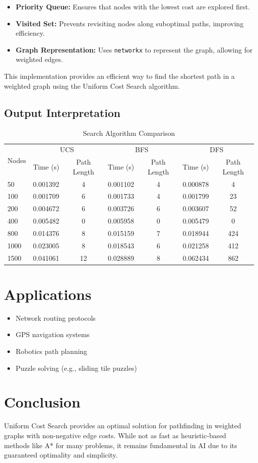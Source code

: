 \documentclass[final, journal, 11pt]{article}
\begin{document}
	\begin{itemize}
		\item \textbf{Priority Queue:} Ensures that nodes with the lowest cost are explored first.
		\item \textbf{Visited Set:} Prevents revisiting nodes along suboptimal paths, improving efficiency.
		\item \textbf{Graph Representation:} Uses \texttt{networkx} to represent the graph, allowing for weighted edges.
	\end{itemize}
	
	This implementation provides an efficient way to find the shortest path in a weighted graph using the Uniform Cost Search algorithm.
	
	\subsection{Output Interpretation}
	
	\begin{table}[htbp]
		\centering
		\caption{Search Algorithm Comparison}
		\begin{tabular}{lcccccc}
			\toprule
			\multirow{2}{*}{Nodes} & \multicolumn{2}{c}{UCS} & \multicolumn{2}{c}{BFS} & \multicolumn{2}{c}{DFS} \\
			\cmidrule(lr){2-3} \cmidrule(lr){4-5} \cmidrule(lr){6-7}
			& Time (s) & Path Length & Time (s) & Path Length & Time (s) & Path Length \\
			\midrule
			50   & 0.001392 & 4           & 0.001102 & 4           & 0.000878 & 4           \\
			100  & 0.001709 & 6           & 0.001733 & 4           & 0.001799 & 23          \\
			200  & 0.004672 & 6           & 0.003726 & 6           & 0.003607 & 52          \\
			400  & 0.005482 & 0           & 0.005958 & 0           & 0.005479 & 0           \\
			800  & 0.014376 & 8           & 0.015159 & 7           & 0.018944 & 424         \\
			1000 & 0.023005 & 8           & 0.018543 & 6           & 0.021258 & 412         \\
			1500 & 0.041061 & 12          & 0.028889 & 8           & 0.062434 & 862         \\
			\bottomrule
		\end{tabular}
	\end{table}
	
	\section{Applications}
	\begin{itemize}
		\item Network routing protocols
		\item GPS navigation systems
		\item Robotics path planning
		\item Puzzle solving (e.g., sliding tile puzzles)
	\end{itemize}
	
	\section{Conclusion}
	Uniform Cost Search provides an optimal solution for pathfinding in weighted graphs with non-negative edge costs. While not as fast as heuristic-based methods like A* for many problems, it remains fundamental in AI due to its guaranteed optimality and simplicity.
	
\end{document}
